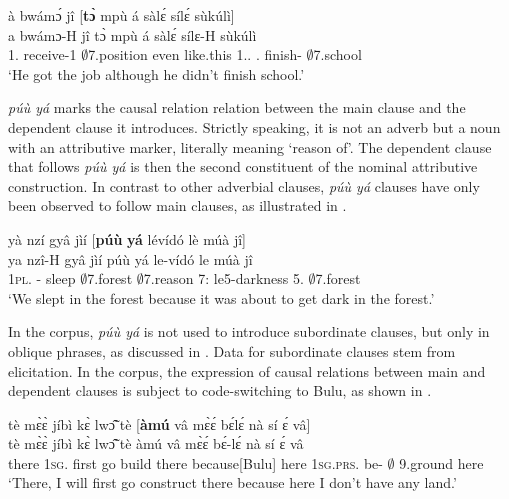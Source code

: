\ea\label{Conc2}
  \glll à bwámɔ́ jî [{\bfseries tɔ̀} mpù á sàlɛ́ sílɛ́ sùkúlì]\textsubscript{{\ADV}} \\
         a bwámɔ-H jî {\db}tɔ̀ mpù á sàlɛ́ sílɛ-H sùkúlì \\
        1.{\PST} receive-{\PST}1 $\emptyset$7.position {\db}even like.this 1.{\PST}.{\NEG} {\NEG}.{\PST} finish-{\R} $\emptyset$7.school \\
    \trans `He got the job although he didn't finish school.'
\z



{\itshape púù yá} marks the causal relation relation between the main clause and the dependent clause it introduces. Strictly speaking, it is not an adverb but a noun with an attributive marker, literally meaning `reason of'. The dependent clause that follows {\itshape púù yá} is then the second constituent of the nominal attributive construction. In contrast to other adverbial clauses, {\itshape púù yá} clauses have only been observed to follow main clauses, as illustrated in .


\ea\label{Causal1}
  \glll yà nzí gyâ jìí [{\bfseries púù} {\bfseries yá} lévídó lè múà jî] \\
        ya nzî-H gyâ jìí {\db}púù yá le-vídó le múà jî \\
         1\textsc{pl}.{\PST} {\PROG}-{\R} sleep $\emptyset$7.forest {\db}$\emptyset$7.reason 7:{\ATT} le5-darkness 5.{\PST} {\PROSP} $\emptyset$7.forest \\
    \trans `We slept in the forest because it was about to get dark in the forest.'
\z

In the corpus, {\itshape púù yá} is not used to introduce subordinate clauses, but only in oblique phrases, as discussed in . Data for subordinate clauses stem from elicitation. In the corpus, the expression of causal relations between main and dependent clauses is subject to code-switching to Bulu, as shown in .


\ea\label{Causal2}
  \glll   tè mɛ̀ɛ̀ jíbì kɛ̀ lwɔ̃̂ tè [{\bfseries àmú} vâ mɛ̀ɛ́ bɛ́lɛ́ nà sí ɛ́ vâ] \\
          tè mɛ̀ɛ̀ jíbì kɛ̀ lwɔ̃̂ tè {\db}àmú vâ mɛ̀ɛ́ bɛ́-lɛ́ nà sí ɛ́ vâ \\
           there 1\textsc{sg}.{\FUT} first go build there {\db}because[Bulu] here 1\textsc{sg}.\textsc{prs}.{\NEG} be-{\NEG} {\COM} $\emptyset$
9.ground {\LOC} here \\
    \trans `There, I will first go construct there because here I don't have any land.'
\z

